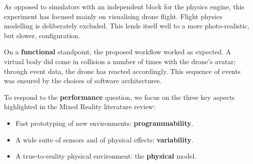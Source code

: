 As opposed to simulators with an independent block for the physics engine, this experiment has focused mainly on visualising drone flight. Flight physics modelling is deliberately excluded. This lends itself well to a more photo-realistic, but slower, configuration. 

On a \textbf{functional} standpoint, the proposed workflow worked as expected. A virtual body did come in collision a number of times with the drone's avatar; through event data, the drone has reacted accordingly. This sequence of events was ensured by the choices of software architectures. 

To respond to the \textbf{performance} question, we focus on the three key aspects highlighted in the Mixed Reality literature review: 

\begin{itemize}
    \item Fast prototyping of new environments: \textbf{programmability}.
    \item A wide suite of sensors and of physical effects: \textbf{variability}.
    \item A true-to-reality physical environment: the \textbf{physical} model.
\end{itemize}

